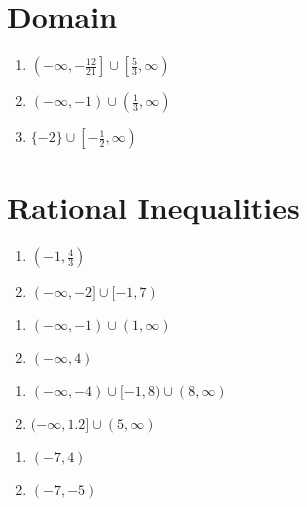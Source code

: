 \section*{Domain}
\begin{enumerate}
	\item $\left(-\infty, -\frac{12}{21}\right] \cup \left[\frac{5}{3}, \infty\right)$
	\item $(-\infty, -1) \cup \left(\frac{1}{3}, \infty\right)$
	\item $\{-2\} \cup \left[-\frac{1}{2}, \infty\right)$
\end{enumerate}

\section*{Rational Inequalities}
\begin{multicols}{2}
\begin{enumerate}
    \item $\left(-1, \frac{4}{3}\right)$
    \item $(-\infty,-2] \cup [-1, 7)$
\end{enumerate} \setcounter{Review}{\value{enumi}}
\end{multicols}
\begin{multicols}{2}
\begin{enumerate}	\setcounter{enumi}{\value{Review}}
    \item $(-\infty, -1) \cup (1, \infty)$
    \item $(-\infty, 4)$
\end{enumerate} \setcounter{Review}{\value{enumi}}
\end{multicols}
\begin{multicols}{2}
\begin{enumerate}	\setcounter{enumi}{\value{Review}}
    \item $(-\infty, -4) \cup [-1, 8) \cup (8, \infty)$
    \item $(-\infty, 1.2] \cup (5, \infty)$
\end{enumerate} \setcounter{Review}{\value{enumi}}
\end{multicols}
\begin{multicols}{2}
\begin{enumerate}	\setcounter{enumi}{\value{Review}}
    \item $(-7, 4)$
    \item $(-7, -5)$
\end{enumerate} \setcounter{Review}{\value{enumi}}
\end{multicols}
